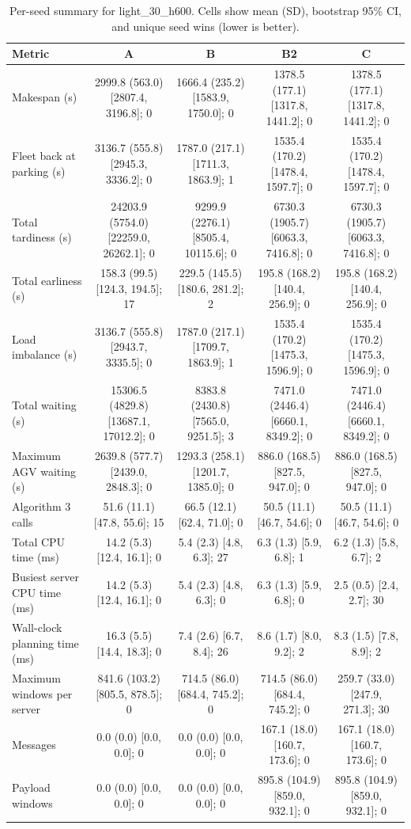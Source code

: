 \begin{table}[t]
\centering
\caption{Per-seed summary for light\_30\_h600. Cells show mean (SD), bootstrap 95\% CI, and unique seed wins (lower is better).}
\label{tab:light-30-h600}
\begin{tabular}{lcccc}
\toprule
Metric & A & B & B2 & C \\
\midrule
Makespan (s) & 2999.8 (563.0) [2807.4, 3196.8]; 0 & 1666.4 (235.2) [1583.9, 1750.0]; 0 & 1378.5 (177.1) [1317.8, 1441.2]; 0 & 1378.5 (177.1) [1317.8, 1441.2]; 0 \\
Fleet back at parking (s) & 3136.7 (555.8) [2945.3, 3336.2]; 0 & 1787.0 (217.1) [1711.3, 1863.9]; 1 & 1535.4 (170.2) [1478.4, 1597.7]; 0 & 1535.4 (170.2) [1478.4, 1597.7]; 0 \\
Total tardiness (s) & 24203.9 (5754.0) [22259.0, 26262.1]; 0 & 9299.9 (2276.1) [8505.4, 10115.6]; 0 & 6730.3 (1905.7) [6063.3, 7416.8]; 0 & 6730.3 (1905.7) [6063.3, 7416.8]; 0 \\
Total earliness (s) & 158.3 (99.5) [124.3, 194.5]; 17 & 229.5 (145.5) [180.6, 281.2]; 2 & 195.8 (168.2) [140.4, 256.9]; 0 & 195.8 (168.2) [140.4, 256.9]; 0 \\
Load imbalance (s) & 3136.7 (555.8) [2943.7, 3335.5]; 0 & 1787.0 (217.1) [1709.7, 1863.9]; 1 & 1535.4 (170.2) [1475.3, 1596.9]; 0 & 1535.4 (170.2) [1475.3, 1596.9]; 0 \\
Total waiting (s) & 15306.5 (4829.8) [13687.1, 17012.2]; 0 & 8383.8 (2430.8) [7565.0, 9251.5]; 3 & 7471.0 (2446.4) [6660.1, 8349.2]; 0 & 7471.0 (2446.4) [6660.1, 8349.2]; 0 \\
Maximum AGV waiting (s) & 2639.8 (577.7) [2439.0, 2848.3]; 0 & 1293.3 (258.1) [1201.7, 1385.0]; 0 & 886.0 (168.5) [827.5, 947.0]; 0 & 886.0 (168.5) [827.5, 947.0]; 0 \\
Algorithm 3 calls & 51.6 (11.1) [47.8, 55.6]; 15 & 66.5 (12.1) [62.4, 71.0]; 0 & 50.5 (11.1) [46.7, 54.6]; 0 & 50.5 (11.1) [46.7, 54.6]; 0 \\
Total CPU time (ms) & 14.2 (5.3) [12.4, 16.1]; 0 & 5.4 (2.3) [4.8, 6.3]; 27 & 6.3 (1.3) [5.9, 6.8]; 1 & 6.2 (1.3) [5.8, 6.7]; 2 \\
Busiest server CPU time (ms) & 14.2 (5.3) [12.4, 16.1]; 0 & 5.4 (2.3) [4.8, 6.3]; 0 & 6.3 (1.3) [5.9, 6.8]; 0 & 2.5 (0.5) [2.4, 2.7]; 30 \\
Wall-clock planning time (ms) & 16.3 (5.5) [14.4, 18.3]; 0 & 7.4 (2.6) [6.7, 8.4]; 26 & 8.6 (1.7) [8.0, 9.2]; 2 & 8.3 (1.5) [7.8, 8.9]; 2 \\
Maximum windows per server & 841.6 (103.2) [805.5, 878.5]; 0 & 714.5 (86.0) [684.4, 745.2]; 0 & 714.5 (86.0) [684.4, 745.2]; 0 & 259.7 (33.0) [247.9, 271.3]; 30 \\
Messages & 0.0 (0.0) [0.0, 0.0]; 0 & 0.0 (0.0) [0.0, 0.0]; 0 & 167.1 (18.0) [160.7, 173.6]; 0 & 167.1 (18.0) [160.7, 173.6]; 0 \\
Payload windows & 0.0 (0.0) [0.0, 0.0]; 0 & 0.0 (0.0) [0.0, 0.0]; 0 & 895.8 (104.9) [859.0, 932.1]; 0 & 895.8 (104.9) [859.0, 932.1]; 0 \\
\bottomrule
\end{tabular}
\end{table}

